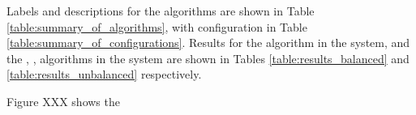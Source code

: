 Labels and descriptions for the algorithms are shown in Table \ref{table:summary_of_algorithms}, with configuration in Table \ref{table:summary_of_configurations}. Results for the \algorithmBalanced{}{} algorithm in the \simulationSimple{}{} system, and the \algorithmEnergy{}{}, \algorithmQuality{}{}, \algorithmDistribution{}{} algorithms in the \simulationExtended{}{} system are shown in Tables \ref{table:results_balanced} and \ref{table:results_unbalanced} respectively.

Figure XXX shows the 